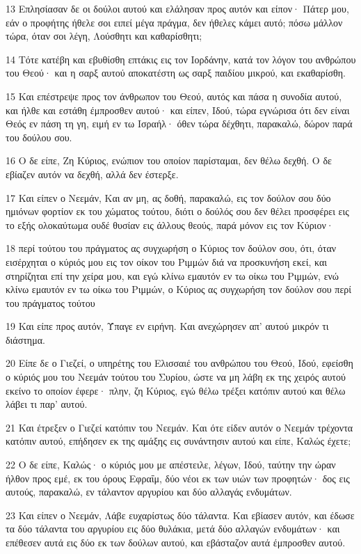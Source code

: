 \par 13 Επλησίασαν δε οι δούλοι αυτού και ελάλησαν προς αυτόν και είπον· Πάτερ μου, εάν ο προφήτης ήθελε σοι ειπεί μέγα πράγμα, δεν ήθελες κάμει αυτό; πόσω μάλλον τώρα, όταν σοι λέγη, Λούσθητι και καθαρίσθητι;
\par 14 Τότε κατέβη και εβυθίσθη επτάκις εις τον Ιορδάνην, κατά τον λόγον του ανθρώπου του Θεού· και η σαρξ αυτού αποκατέστη ως σαρξ παιδίου μικρού, και εκαθαρίσθη.
\par 15 Και επέστρεψε προς τον άνθρωπον του Θεού, αυτός και πάσα η συνοδία αυτού, και ήλθε και εστάθη έμπροσθεν αυτού· και είπεν, Ιδού, τώρα εγνώρισα ότι δεν είναι Θεός εν πάση τη γη, ειμή εν τω Ισραήλ· όθεν τώρα δέχθητι, παρακαλώ, δώρον παρά του δούλου σου.
\par 16 Ο δε είπε, Ζη Κύριος, ενώπιον του οποίον παρίσταμαι, δεν θέλω δεχθή. Ο δε εβίαζεν αυτόν να δεχθή, αλλά δεν έστερξε.
\par 17 Και είπεν ο Νεεμάν, Και αν μη, ας δοθή, παρακαλώ, εις τον δούλον σου δύο ημιόνων φορτίον εκ του χώματος τούτου, διότι ο δούλός σου δεν θέλει προσφέρει εις το εξής ολοκαύτωμα ουδέ θυσίαν εις άλλους θεούς, παρά μόνον εις τον Κύριον·
\par 18 περί τούτου του πράγματος ας συγχωρήση ο Κύριος τον δούλον σου, ότι, όταν εισέρχηται ο κύριός μου εις τον οίκον του Ριμμών διά να προσκυνήση εκεί, και στηρίζηται επί την χείρα μου, και εγώ κλίνω εμαυτόν εν τω οίκω του Ριμμών, ενώ κλίνω εμαυτόν εν τω οίκω του Ριμμών, ο Κύριος ας συγχωρήση τον δούλον σου περί του πράγματος τούτου
\par 19 Και είπε προς αυτόν, Ύπαγε εν ειρήνη. Και ανεχώρησεν απ' αυτού μικρόν τι διάστημα.
\par 20 Είπε δε ο Γιεζεί, ο υπηρέτης του Ελισσαιέ του ανθρώπου του Θεού, Ιδού, εφείσθη ο κύριός μου του Νεεμάν τούτου του Συρίου, ώστε να μη λάβη εκ της χειρός αυτού εκείνο το οποίον έφερε· πλην, ζη Κύριος, εγώ θέλω τρέξει κατόπιν αυτού και θέλω λάβει τι παρ' αυτού.
\par 21 Και έτρεξεν ο Γιεζεί κατόπιν του Νεεμάν. Και ότε είδεν αυτόν ο Νεεμάν τρέχοντα κατόπιν αυτού, επήδησεν εκ της αμάξης εις συνάντησιν αυτού και είπε, Καλώς έχετε;
\par 22 Ο δε είπε, Καλώς· ο κύριός μου με απέστειλε, λέγων, Ιδού, ταύτην την ώραν ήλθον προς εμέ, εκ του όρους Εφραΐμ, δύο νέοι εκ των υιών των προφητών· δος εις αυτούς, παρακαλώ, εν τάλαντον αργυρίου και δύο αλλαγάς ενδυμάτων.
\par 23 Και είπεν ο Νεεμάν, Λάβε ευχαρίστως δύο τάλαντα. Και εβίασεν αυτόν, και έδωσε τα δύο τάλαντα του αργυρίου εις δύο θυλάκια, μετά δύο αλλαγών ενδυμάτων· και επέθεσεν αυτά εις δύο εκ των δούλων αυτού, και εβάσταζον αυτά έμπροσθεν αυτού.
